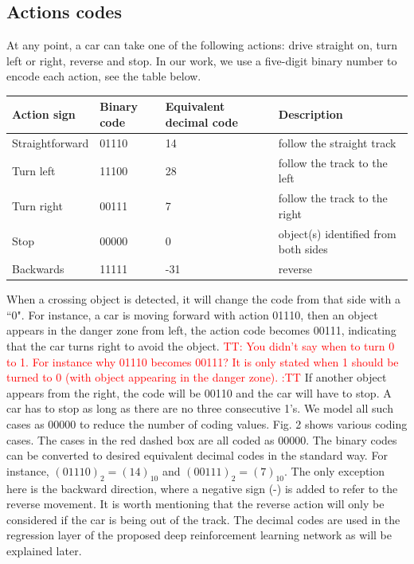 \documentclass{svproc}
\renewcommand{\tt}[1]{\textcolor{red} {TT: #1 :TT} }
\begin{document}
	\subsection{Actions codes} \label{sec:action}
	At any point, a car can take one of the following actions: drive straight on, turn left or right, reverse and stop. In our work, we use a five-digit binary number to encode each action, see the table below. %
	\vspace{-0.5cm}
	\begin{center}	\begin{tabular}{|C{2.5cm}|C{1.3cm}|C{2.5cm}|C{5.5cm}|}
			\hline
			\textbf{Action sign} & \textbf{Binary code} & \textbf{Equivalent decimal code} & \textbf{Description} \\ \hline
			Straightforward	& 01110	& 14 & follow the straight track\\ \hline
			Turn left	& 11100 & 28 & follow the track to the left \\ \hline
			Turn right	& 00111 & 7 & follow the track to the right \\ \hline
			Stop& 00000 & 0 & object(s) identified from both sides\\ \hline
			Backwards& 11111 & -31 & reverse \\ \hline
		\end{tabular}
	\end{center}
	When a crossing object is detected, it will change the code from that side with a ``0". For instance, a car is moving forward with action 01110, then an object appears in the danger zone from left, the action code becomes 00111, indicating that the car turns right to avoid the object. \tt{You didn't say when to turn 0 to 1. For instance why 01110 becomes 00111? It is only stated when 1 should be turned to 0 (with object appearing in the danger zone).}If another object appears from the right, the code will be 00110 and the car will have to stop. A car has to stop as long as there are no three consecutive 1's. We model all such cases as 00000 to reduce the number of coding values. Fig. 2 shows various coding cases. The cases in the red dashed box are all coded as 00000.
	The binary codes can be converted to desired equivalent decimal codes in the standard way. For instance, $(01110)_2=(14)_{10}$ and $(00111)_2=(7)_{10}$. The only exception here is the backward direction, where a negative sign (-) is added to refer to the reverse movement. It is worth mentioning that the reverse action will only be considered if the car is being out of the track. The decimal codes are used in the regression layer of the proposed deep reinforcement learning network as will be explained later. 
\end{document}
